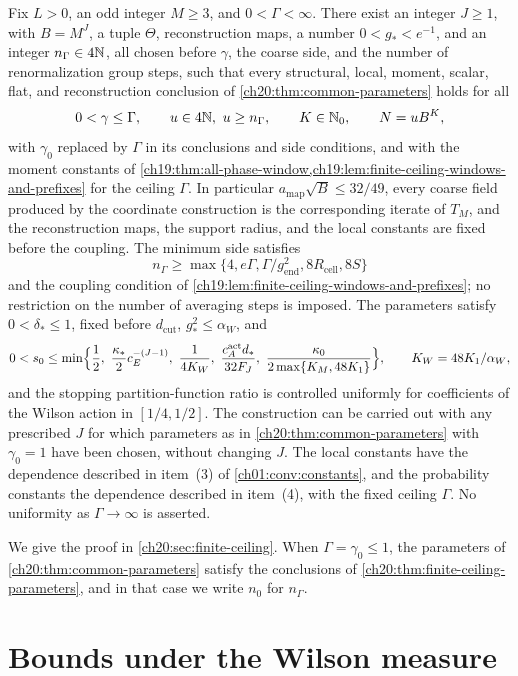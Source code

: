 \begin{theorem}\label{ch20:thm:finite-ceiling-parameters}
Fix $L>0$, an odd integer $M\ge3$, and $0<\Gamma<\infty$. There exist an integer $J\ge1$, with $B=M^J$, a tuple $\Theta$, reconstruction maps, a number $0<g_*<e^{-1}$, and an integer $n_\Gamma\in4\mathbb N$, all chosen before $\gamma$, the coarse side, and the number of renormalization group steps, such that every structural, local, moment, scalar, flat, and reconstruction conclusion of \cref{ch20:thm:common-parameters} holds for all
\[
 0<\gamma\le\Gamma,\qquad u\in4\mathbb N,\ u\ge n_\Gamma,\qquad K\in\mathbb N_0,\qquad N=uB^K,
\]
with $\gamma_0$ replaced by $\Gamma$ in its conclusions and side conditions, and with the moment constants of \cref{ch19:thm:all-phase-window,ch19:lem:finite-ceiling-windows-and-prefixes} for the ceiling $\Gamma$. In particular $a_{\mathrm{map}}\sqrt B\le32/49$, every coarse field produced by the coordinate construction is the corresponding iterate of $T_M$, and the reconstruction maps, the support radius, and the local constants are fixed before the coupling. The minimum side satisfies
\[
 n_\Gamma\ge\max\{4,e\Gamma,\Gamma/g_{\mathrm{end}}^2,8R_{\mathrm{cell}},8S\}
\]
and the coupling condition of \cref{ch19:lem:finite-ceiling-windows-and-prefixes}; no restriction on the number of averaging steps is imposed. The parameters satisfy $0<\delta_*\le1$, fixed before $d_{\mathrm{cut}}$, $g_*^2\le\alpha_W$, and
\[
 0<s_0\le\min\Bigl\{\frac12,\ \frac{\kappa_*}{2}c_E^{-(J-1)},\ \frac1{4K_W},\ \frac{c_A^{\mathrm{act}}d_*}{32F_J},\ \frac{\kappa_0}{2\max\{K_M,48K_1\}}\Bigr\},\qquad K_W=48K_1/\alpha_W,
\]
and the stopping partition-function ratio is controlled uniformly for coefficients of the Wilson action in $[1/4,1/2]$. The construction can be carried out with any prescribed $J$ for which parameters as in \cref{ch20:thm:common-parameters} with $\gamma_0=1$ have been chosen, without changing $J$. The local constants have the dependence described in item~\textup{(3)} of \cref{ch01:conv:constants}, and the probability constants the dependence described in item~\textup{(4)}, with the fixed ceiling $\Gamma$. No uniformity as $\Gamma\to\infty$ is asserted.
\end{theorem}

We give the proof in \cref{ch20:sec:finite-ceiling}. When $\Gamma=\gamma_0\le1$, the parameters of \cref{ch20:thm:common-parameters} satisfy the conclusions of \cref{ch20:thm:finite-ceiling-parameters}, and in that case we write $n_0$ for $n_\Gamma$.

\section{Bounds under the Wilson measure}\label{ch20:sec:action}

